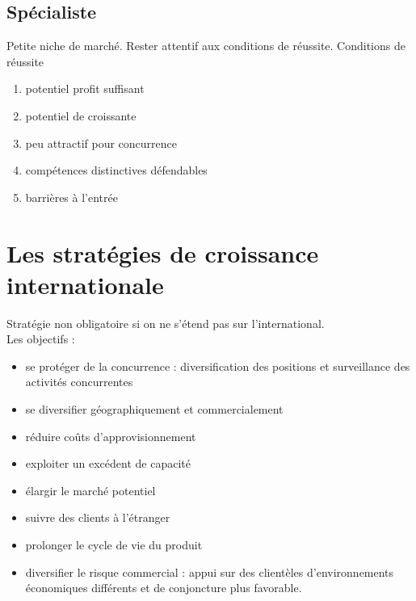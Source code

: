 		\subsection{Spécialiste}
		
		Petite niche de marché. Rester attentif aux conditions de réussite. Conditions de réussite
		
		\begin{enumerate}
			\item potentiel profit suffisant
			\item potentiel de croissante
			\item peu attractif pour concurrence
			\item compétences distinctives défendables
			\item barrières à l'entrée
		\end{enumerate}
			
	\section{Les stratégies de croissance internationale}
	
	Stratégie non obligatoire si on ne s'étend pas sur l'international. \\
	
	Les objectifs :
	
	\begin{itemize}
		\item se protéger de la concurrence : diversification des positions et surveillance des activités concurrentes
		\item se diversifier géographiquement et commercialement
		\item réduire coûts d'approvisionnement
		\item exploiter un excédent de capacité
		\item élargir le marché potentiel
		\item suivre des clients à l'étranger
		\item prolonger le cycle de vie du produit
		\item diversifier le risque commercial : appui sur des clientèles d'environnements économiques différents et de conjoncture plus favorable.
	\end{itemize}